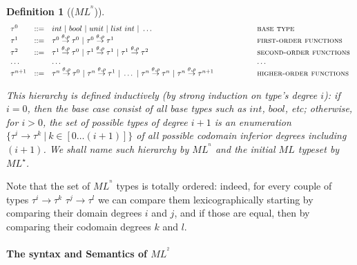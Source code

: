 \documentclass[a4paper,11pt,oneside]{article}
\theoremstyle{plain}
\newtheorem{definition}{Definition}[subsection]
\begin{document}
\begin{definition}[($ML^{^{n}}$)]
\begin{displaymath}
	\begin{array}{lll@{\hspace*{2cm}}l}
	\tau^0 & ::= & int~|~bool~|~unit~|~list~int~|~\dots~ & \textsc{base
          type} \\ \tau^1 & ::= & \tau^0 \stackrel{\theta, \rho}{\rightarrow}
        \tau^0 ~|~ \tau^0 \stackrel{\theta, \rho}{\rightarrow} \tau^1 &
        \textsc{first-order functions}\\ \tau^2 & ::= & \tau^1 \stackrel{\theta,
          \rho}{\rightarrow} \tau^0 ~|~ \tau^1 \stackrel{\theta,
          \rho}{\rightarrow} \tau^1 ~|~ \tau^1 \stackrel{\theta,
          \rho}{\rightarrow} \tau^2
	& \textsc{second-order functions} \\ \dots & & \dots & \dots
        \\ \tau^{n+1} & ::= & \tau^{n} \stackrel{\theta, \rho}{\rightarrow}
        \tau^0 ~|~ \tau^{n} \stackrel{\theta, \rho}{\rightarrow} \tau^1 ~|~
        \dots ~|~ \tau^{n} \stackrel{\theta, \rho}{\rightarrow} \tau^{n} ~|~
        \tau^{n} \stackrel{\theta, \rho}{\rightarrow}\tau^{n+1}
	& \textsc{higher-order functions} \\
	
	\end{array}
\end{displaymath}
\label{MLn-ty-d}

This hierarchy is defined inductively (by strong induction on type's degree
$i$): if $i=0$, then the base case consist of all base types such as $int$,
$bool$, etc; otherwise, for $i > 0$, the set of possible types of degree $i+1$
is an enumeration $\{\tau^{i} \rightarrow \tau^{k} ~|~ k \in [ 0 \dots (i+1) ]
\}$ of all possible codomain inferior degrees including $(i+1)$.
We shall name such hierarchy by $ML^{^{n}}$ and the initial $ML$ typeset by
$ML^\star$.
\end{definition}

Note that the set of $ML^{^{n}}$ types is totally ordered: indeed, for every
couple of types $\tau^i \rightarrow \tau^k$ $\tau^j \rightarrow \tau^l$ we can
compare them lexicographically starting by comparing their domain degrees $i$
and $j$, and if those are equal, then by comparing their codomain degrees $k$
and $l$.

\paragraph*{The syntax and Semantics of $ML^{^{2}}$}
\end{document}
